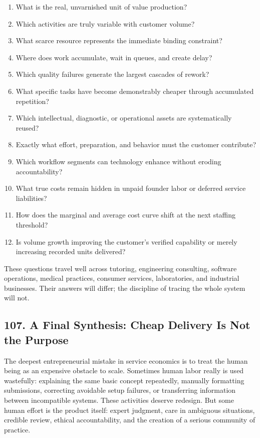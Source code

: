\begin{enumerate}
\item What is the real, unvarnished unit of value production?
\item Which activities are truly variable with customer volume?
\item What scarce resource represents the immediate binding constraint?
\item Where does work accumulate, wait in queues, and create delay?
\item Which quality failures generate the largest cascades of rework?
\item What specific tasks have become demonstrably cheaper through accumulated repetition?
\item Which intellectual, diagnostic, or operational assets are systematically reused?
\item Exactly what effort, preparation, and behavior must the customer contribute?
\item Which workflow segments can technology enhance without eroding accountability?
\item What true costs remain hidden in unpaid founder labor or deferred service liabilities?
\item How does the marginal and average cost curve shift at the next staffing threshold?
\item Is volume growth improving the customer's verified capability or merely increasing recorded units delivered?
\end{enumerate}

These questions travel well across tutoring, engineering consulting, software operations, medical practices, consumer services, laboratories, and industrial businesses. Their answers will differ; the discipline of tracing the whole system will not.

\subsection*{107. A Final Synthesis: Cheap Delivery Is Not the Purpose}

The deepest entrepreneurial mistake in service economics is to treat the human being as an expensive obstacle to scale. Sometimes human labor really is used wastefully: explaining the same basic concept repeatedly, manually formatting submissions, correcting avoidable setup failures, or transferring information between incompatible systems. These activities deserve redesign. But some human effort is the product itself: expert judgment, care in ambiguous situations, credible review, ethical accountability, and the creation of a serious community of practice.

